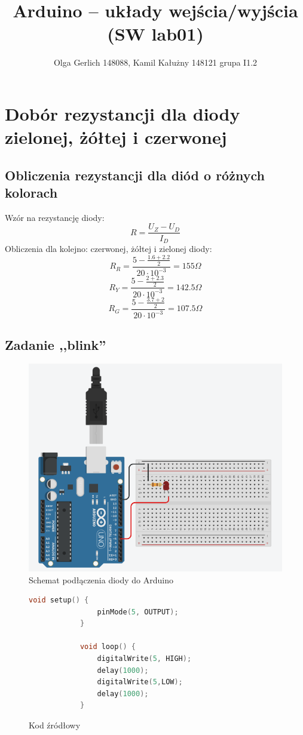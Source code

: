 \documentclass[polish,a4paper]{article}
\title{Arduino – układy wejścia/wyjścia (SW lab01)}
\author{Olga Gerlich 148088, Kamil Kałużny 148121 grupa I1.2}
\begin{document}
	\maketitle
	\section{Dobór rezystancji dla diody zielonej, żółtej i czerwonej}
	\subsection{Obliczenia rezystancji dla diód o różnych kolorach}
	Wzór na rezystancję diody:
	$$R = \frac{U_Z - U_D}{I_D}$$
	Obliczenia dla kolejno: czerwonej, żółtej i zielonej diody:
	$$R_R = \frac{5 - \frac{1.6 + 2.2}{2}}{20 \cdot 10^{-3}} = 155 \Omega$$
	$$R_Y = \frac{5 - \frac{2 + 2.3}{2}}{20 \cdot 10^{-3}} = 142.5 \Omega$$
	$$R_G = \frac{5 - \frac{3.7 + 2}{2}}{20 \cdot 10^{-3}} = 107.5 \Omega$$
	
	\subsection{Zadanie ,,blink''}
	\begin{figure}[h!]
		\begin{center}
			\includegraphics[scale=0.4]{01_blink.png}
			\caption*{Schemat podłączenia diody do Arduino}
		\end{center}
	\end{figure}
	\begin{figure}[h!]
		\begin{lstlisting}[language=C++]
			void setup() {
				pinMode(5, OUTPUT);
			}
			
			void loop() {
				digitalWrite(5, HIGH);
				delay(1000);
				digitalWrite(5,LOW);
				delay(1000);
			}
		\end{lstlisting}
		\caption*{Kod źródłowy}
	\end{figure}
	
\end{document}
